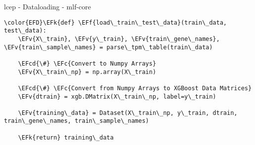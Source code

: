 \documentclass[bigger]{beamer}
\newcommand{\EFc}[1]{\textcolor{EFc}{#1}} %
\newcommand{\EFcd}[1]{\textcolor{EFcd}{#1}} %
\newcommand{\EFk}[1]{\textcolor{EFk}{#1}} %
\newcommand{\EFf}[1]{\textcolor{EFf}{#1}} %
\newcommand{\EFv}[1]{\textcolor{EFv}{#1}} %
\begin{document}
\begin{frame}[label={sec:org30bf51f},fragile]{lcep - Dataloading - mlf-core}
 \small
\begin{Code}
\begin{Verbatim}
\color{EFD}\EFk{def} \EFf{load\_train\_test\_data}(train\_data, test\_data):
    \EFv{X\_train}, \EFv{y\_train}, \EFv{train\_gene\_names}, \EFv{train\_sample\_names} = parse\_tpm\_table(train\_data)

    \EFcd{\#} \EFc{Convert to Numpy Arrays}
    \EFv{X\_train\_np} = np.array(X\_train)

    \EFcd{\#} \EFc{Convert from Numpy Arrays to XGBoost Data Matrices}
    \EFv{dtrain} = xgb.DMatrix(X\_train\_np, label=y\_train)

    \EFv{training\_data} = Dataset(X\_train\_np, y\_train, dtrain, train\_gene\_names, train\_sample\_names)

    \EFk{return} training\_data
\end{Verbatim}
\end{Code}
\end{frame}
\end{document}

